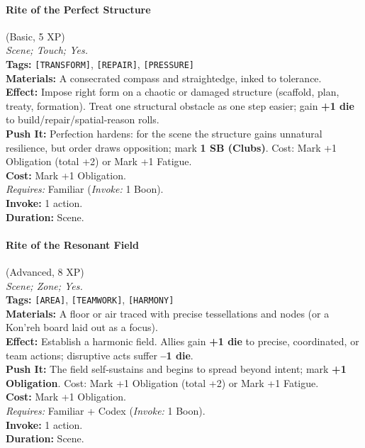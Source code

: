 \paragraph{Rite of the Perfect Structure} (Basic, 5 XP) \hfill \\
\emph{Scene; Touch; Yes.} \\
\textbf{Tags:} \texttt{[TRANSFORM]}, \texttt{[REPAIR]}, \texttt{[PRESSURE]} \\
\textbf{Materials:} A consecrated compass and straightedge, inked to tolerance. \\
\textbf{Effect:} Impose right form on a chaotic or damaged structure (scaffold, plan, treaty, formation). Treat one structural obstacle as one step easier; gain \textbf{+1 die} to build/repair/spatial-reason rolls. \\
\textbf{Push It:} Perfection hardens: for the scene the structure gains unnatural resilience, but order draws opposition; mark \textbf{1 SB (Clubs)}. Cost: Mark +1 Obligation (total +2) or Mark +1 Fatigue. \\
\textbf{Cost:} Mark +1 Obligation. \\
\textit{Requires:} Familiar (\textit{Invoke:} 1 Boon). \\
\textbf{Invoke:} 1 action. \\
\textbf{Duration:} Scene.

\paragraph{Rite of the Resonant Field} (Advanced, 8 XP) \hfill \\
\emph{Scene; Zone; Yes.} \\
\textbf{Tags:} \texttt{[AREA]}, \texttt{[TEAMWORK]}, \texttt{[HARMONY]} \\
\textbf{Materials:} A floor or air traced with precise tessellations and nodes (or a Kon'reh board laid out as a focus). \\
\textbf{Effect:} Establish a harmonic field. Allies gain \textbf{+1 die} to precise, coordinated, or team actions; disruptive acts suffer \textbf{--1 die}. \\
\textbf{Push It:} The field self-sustains and begins to spread beyond intent; mark \textbf{+1 Obligation}. Cost: Mark +1 Obligation (total +2) or Mark +1 Fatigue. \\
\textbf{Cost:} Mark +1 Obligation. \\
\textit{Requires:} Familiar + Codex (\textit{Invoke:} 1 Boon). \\
\textbf{Invoke:} 1 action. \\
\textbf{Duration:} Scene.

